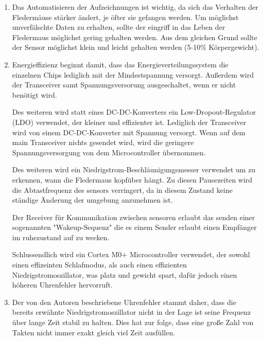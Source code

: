 

\date{Sonntag, 17.05.2020}


    \maketitle
    \thispagestyle{fancy}


    \begin{enumerate}
        \item Das Automatisieren der Aufzeichnungen ist wichtig, da sich das Verhalten der Fledermäuse stärker ändert, je öfter sie gefangen werden. Um möglichst unverfälschte Daten zu erhalten, sollte der eingriff in das Leben der Fledermaus möglichst gering gehalten werden. Aus dem gleichen Grund sollte der Sensor möglichst klein und leicht gehalten werden (5-10\% Körpergewicht).
        
        \item Energieffizienz beginnt damit, dass das Energieverteilungssystem die einzelnen Chips lediglich mit der Mindestspannung versorgt. Außerdem wird der Transceiver samt Spannungsversorung ausgeschaltet, wenn er nicht benötigt wird.
        
        Des weiteren wird statt eines DC-DC-Konverters ein Low-Dropout-Regulator (LDO) verwendet, der kleiner und effizienter ist. Lediglich der Transceiver wird von einem DC-DC-Konverter mit Spannung versorgt. Wenn auf dem main Transceiver nichts gesendet wird, wird die geringere Spannungsversorgung von dem Microcontroller übernommen. 
        
        Des weiteren wird ein Niedrigstrom-Beschläunigungs\-messer verwendet um zu erkennen, wann die Fledermaus kopfüber hängt. Zu diesen Pausezeiten wird die Abtastfrequenz des sensors verringert, da in diesem Zustand keine ständige Änderung der umgebung anzunehmen ist.

        Der Receiver für Kommunikation zwischen sensoren erlaubt das senden einer sogenannten "Wakeup-Sequenz" die es einem Sender erlaubt einen Empfänger im ruhezustand auf zu wecken.

        Schlussendlich wird ein Cortex M0+ Microcontroller verwendet, der sowohl einen effizeinten Schlafmodus, als auch einen effizienten Niedrigstromoszillator, was platz und gewicht spart, dafür jedoch einen höheren Uhrenfehler hervorruft.
        
        \item Der von den Autoren beschriebene Uhrenfehler stammt daher, dass die bereits erwähnte Niedrigstromoszillator nicht in der Lage ist seine Frequenz über lange Zeit stabil zu halten. Dies hat zur folge, dass eine große Zahl von Takten nicht immer exakt gleich viel Zeit ausfüllen. 
        

\end{enumerate}
